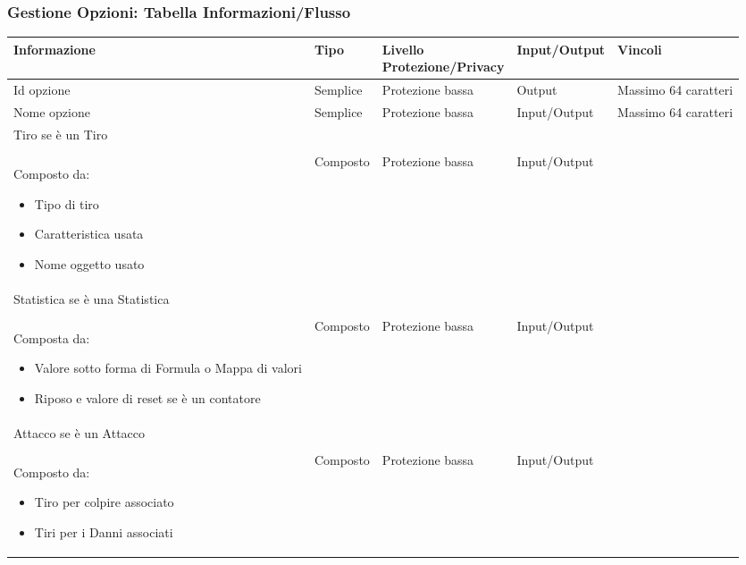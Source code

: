 \documentclass[a4paper, 11pt]{article}
\let\newline\\
\begin{document}
\subsubsection*{Gestione Opzioni: Tabella Informazioni/Flusso}
\begin{adjustwidth}{-1.5cm}{-1.5cm}
\begin{center}
    \begin{tabular}{|p{3cm}|p{1.5cm}|p{3.5cm}|p{2.5cm}|p{4cm}|}
        \hline
        \textbf{Informazione} & \textbf{Tipo} & \textbf{Livello \newline Protezione/Privacy} & \textbf{Input/Output} & \textbf{Vincoli} \\
        \hline
        Id opzione & Semplice & Protezione bassa & Output & Massimo 64 caratteri \\\hline
        Nome opzione & Semplice & Protezione bassa & Input/Output & Massimo 64 caratteri \\
        \hline
        Tiro se è un Tiro \newline \newline Composto da:
        \begin{itemize}
            \item Tipo di tiro 
            \item Caratteristica usata 
            \item Nome oggetto usato 
        \end{itemize}
        & Composto & Protezione bassa & Input/Output & \\
        \hline
        Statistica se è una Statistica \newline \newline Composta da: \begin{itemize}
            \item Valore sotto forma di Formula o Mappa di valori 
            \item Riposo e valore di reset se è un contatore
        \end{itemize} & Composto & Protezione bassa & Input/Output & \\
        \hline
        Attacco se è un Attacco \newline \newline Composto da: \begin{itemize}
            \item Tiro per colpire associato 
            \item Tiri per i Danni associati
        \end{itemize}  & Composto & Protezione bassa & Input/Output & \\

\end{tabular}
\end{center}
\end{adjustwidth}
\end{document}
